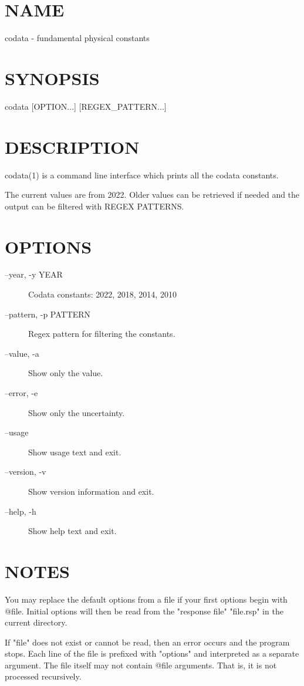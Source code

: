 \section*{NAME}
codata - fundamental physical constants

\section*{SYNOPSIS}
{\ttfamily
codata [OPTION...] [REGEX\_PATTERN...]

}
\section*{DESCRIPTION}
codata(1) is a command line interface which prints all the codata
constants.

The current values are from 2022.
Older values can be retrieved if needed and
the output can be filtered with REGEX PATTERNS.


\section*{OPTIONS}
\begin{description}
\item[--year, -y YEAR] Codata constants: 2022, 2018, 2014, 2010
\item[--pattern, -p PATTERN] Regex pattern for filtering the constants.
\item[--value, -a] Show only the value.
\item[--error, -e] Show only the uncertainty.
\item[--usage] Show usage text and exit.
\item[--version, -v] Show version information and exit.
\item[--help, -h] Show help text and exit.
\end{description}

\section*{NOTES}
You may replace the default options from a file if your first
options begin with @file.
Initial options will then be read from the "response file"
"file.rsp" in the current directory.

If "file" does not exist or cannot be read, then an error occurs and
the program stops. Each line of the file is prefixed with "options"
and interpreted as a separate argument. The file itself may not
contain @file arguments. That is, it is not processed recursively.

